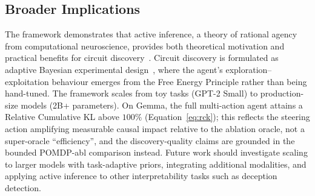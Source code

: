 \subsection{Broader Implications}

The \ACD{} framework demonstrates that active inference, a theory of rational agency from computational neuroscience, provides both theoretical motivation and practical benefits for circuit discovery~\cite{Hubinger2019,Bereska2024}. Circuit discovery is formulated as adaptive Bayesian experimental design~\cite{MacKay2003}, where the agent's exploration--exploitation behaviour emerges from the Free Energy Principle rather than being hand-tuned. The framework scales from toy tasks (GPT-2 Small) to production-size models (2B+ parameters). On Gemma, the full multi-action agent attains a Relative Cumulative KL above $100\%$ (Equation~\ref{eq:rck}); this reflects the steering action amplifying measurable causal impact relative to the ablation oracle, not a super-oracle ``efficiency'', and the discovery-quality claims are grounded in the bounded POMDP-abl comparison instead. Future work should investigate scaling to larger models with task-adaptive priors, integrating additional modalities, and applying active inference to other interpretability tasks such as deception detection.
